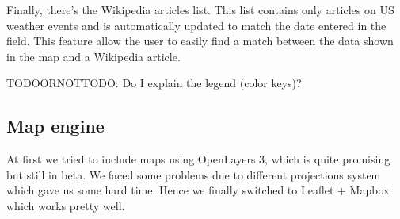 Finally, there's the Wikipedia articles list. This list contains only articles on US weather events and is automatically updated to match the date entered in the field. This feature allow the user to easily find a match between the data shown in the map and a Wikipedia article.

TODOORNOTTODO: Do I explain the legend (color keys)?

\subsection{Map engine}
At first we tried to include maps using OpenLayers 3, which is quite promising but still in beta. We faced some problems due to different projections system which gave us some hard time. Hence we finally switched to Leaflet + Mapbox which works pretty well.
